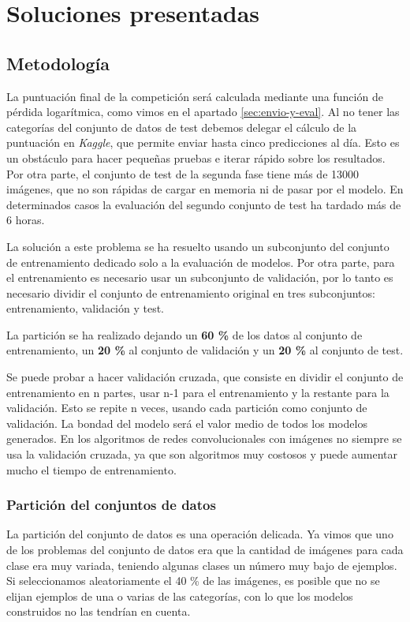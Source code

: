 
\chapter{Soluciones presentadas} %
\label{cap:soluciones} %

\section{Metodología}
\label{sec:metodology}

La puntuación final de la competición será calculada mediante una función de
pérdida logarítmica, como vimos en el apartado \ref{sec:envio-y-eval}. Al no
tener las categorías del conjunto de datos de test debemos delegar el cálculo de
la puntuación en \textit{Kaggle}, que permite enviar hasta cinco predicciones al
día. Esto es un obstáculo para hacer pequeñas pruebas e iterar rápido sobre los
resultados. Por otra parte, el conjunto de test de la segunda fase tiene más de
13000 imágenes, que no son rápidas de cargar en memoria ni de pasar por el
modelo. En determinados casos la evaluación del segundo conjunto de test ha
tardado más de 6 horas.

La solución a este problema se ha resuelto usando un subconjunto del conjunto de entrenamiento dedicado solo a la evaluación de modelos. Por otra parte, para el entrenamiento es necesario usar un subconjunto de validación, por lo tanto es necesario dividir el conjunto de entrenamiento original en tres subconjuntos: entrenamiento, validación y test.

La partición se ha realizado dejando un \textbf{60 \%} de los datos al conjunto de entrenamiento, un \textbf{20 \%} al conjunto de validación y un \textbf{20 \%} al conjunto de test.

Se puede probar a hacer validación cruzada, que consiste en dividir el conjunto de entrenamiento en n partes, usar n-1 para el entrenamiento y la restante para la validación. Esto se repite n veces, usando cada partición como conjunto de validación. La bondad del modelo será el valor medio de todos los modelos generados. En los algoritmos de redes convolucionales con imágenes no siempre se usa la validación cruzada, ya que son algoritmos muy costosos y puede aumentar mucho el tiempo de entrenamiento.

\subsection{Partición del conjuntos de datos}
La partición del conjunto de datos es una operación delicada. Ya vimos que uno de los problemas del conjunto de datos era que la cantidad de imágenes para cada clase era muy variada, teniendo algunas clases un número muy bajo de ejemplos. Si seleccionamos aleatoriamente el 40 \% de las imágenes, es posible que no se elijan ejemplos de una o varias de las categorías, con lo que los modelos construidos no las tendrían en cuenta.

